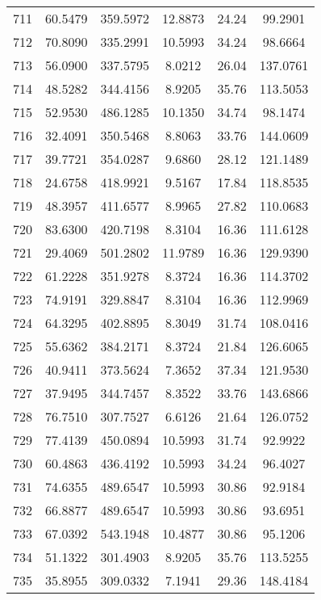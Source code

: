\begin{center}
\begin{footnotesize}
\begin{tabular}{|c|ccccc|}
711 & 60.5479 & 359.5972 & 12.8873 & 24.24 & 99.2901 \\
712 & 70.8090 & 335.2991 & 10.5993 & 34.24 & 98.6664 \\
713 & 56.0900 & 337.5795 & 8.0212 & 26.04 & 137.0761 \\
714 & 48.5282 & 344.4156 & 8.9205 & 35.76 & 113.5053 \\
715 & 52.9530 & 486.1285 & 10.1350 & 34.74 & 98.1474 \\
716 & 32.4091 & 350.5468 & 8.8063 & 33.76 & 144.0609 \\
717 & 39.7721 & 354.0287 & 9.6860 & 28.12 & 121.1489 \\
718 & 24.6758 & 418.9921 & 9.5167 & 17.84 & 118.8535 \\
719 & 48.3957 & 411.6577 & 8.9965 & 27.82 & 110.0683 \\
720 & 83.6300 & 420.7198 & 8.3104 & 16.36 & 111.6128 \\
721 & 29.4069 & 501.2802 & 11.9789 & 16.36 & 129.9390 \\
722 & 61.2228 & 351.9278 & 8.3724 & 16.36 & 114.3702 \\
723 & 74.9191 & 329.8847 & 8.3104 & 16.36 & 112.9969 \\
724 & 64.3295 & 402.8895 & 8.3049 & 31.74 & 108.0416 \\
725 & 55.6362 & 384.2171 & 8.3724 & 21.84 & 126.6065 \\
726 & 40.9411 & 373.5624 & 7.3652 & 37.34 & 121.9530 \\
727 & 37.9495 & 344.7457 & 8.3522 & 33.76 & 143.6866 \\
728 & 76.7510 & 307.7527 & 6.6126 & 21.64 & 126.0752 \\
729 & 77.4139 & 450.0894 & 10.5993 & 31.74 & 92.9922 \\
730 & 60.4863 & 436.4192 & 10.5993 & 34.24 & 96.4027 \\
731 & 74.6355 & 489.6547 & 10.5993 & 30.86 & 92.9184 \\
732 & 66.8877 & 489.6547 & 10.5993 & 30.86 & 93.6951 \\
733 & 67.0392 & 543.1948 & 10.4877 & 30.86 & 95.1206 \\
734 & 51.1322 & 301.4903 & 8.9205 & 35.76 & 113.5255 \\
735 & 35.8955 & 309.0332 & 7.1941 & 29.36 & 148.4184 \\
\hline
\end{tabular}
\end{footnotesize}
\end{center}


